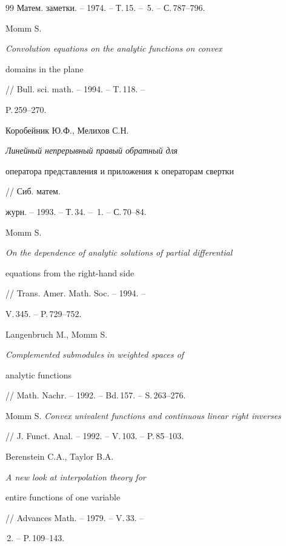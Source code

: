 \begin{thebibliography}{99}
Матем. заметки. -- 1974. -- Т.\,15. -- \No\,5. -- С.\,787--796. 


 




Momm S. {\em Convolution equations on the analytic functions on convex 


domains in the plane} // Bull. sci. math. -- 1994. -- T.\,118. -- 


P.\,259--270. 


 




Коробейник Ю.Ф., Мелихов С.Н. {\em Линейный непрерывный правый обратный для 


оператора представления и приложения к операторам свертки} // Сиб. матем. 


журн. -- 1993. -- Т.\,34. -- \No\,1. -- С.\,70--84. 


 




Momm S. {\em On the dependence of analytic solutions of partial differential 


equations from the right-hand side} // Trans. Amer. Math. Soc. -- 1994. -- 


V.\,345. -- P.\,729--752. 


 




Langenbruch M., Momm S. {\em Complemented submodules in weighted spaces of 


analytic functions} // Math. Nachr. -- 1992. -- Bd.\,157. -- S.\,263--276. 


 




Momm S. {\em Convex univalent functions and continuous linear right inverses} 


// J. Funct. Anal. -- 1992. -- V.\,103. -- P.\,85--103. 


 




Berenstein C.A., Taylor B.A. {\em A new look at interpolation theory for 


entire functions of one variable} // Advances Math. -- 1979. -- V.\,33. -- 


\No\,2. -- P.\,109--143. 



\end{thebibliography}
